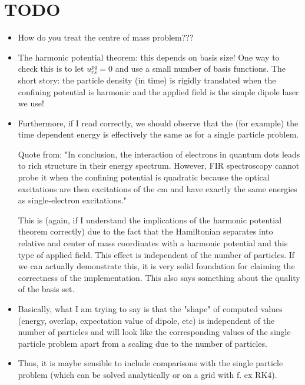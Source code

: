 \documentclass[aip,jcp,reprint,floatfix]{revtex4-1}
\begin{document}
\section{TODO}
\begin{itemize}
    \item How do you treat the centre of mass problem???
    \item The harmonic potential theorem\cite{HarmonicPotentialTheorem}: this depends on basis size! One way to check this is to let $u^{pq}_{rs} = 0$ and use a small number of basis functions. The short story: the particle density (in time) is rigidly translated when the confining potential is harmonic and the applied field is the simple dipole laser we use! 
    \item Furthermore, if I read correctly, we should observe that the (for example) the time dependent energy is effectively the same as for a single particle problem. 
    
    Quote from\cite{Chakraborty}: "In conclusion, the interaction of electrons in quantum
dots leads to rich structure in their energy spectrum.
However, FIR spectroscopy cannot probe it when the
confining potential is quadratic because the optical excitations are then excitations of the cm and have exactly
the same energies as single-electron excitations."
    
    This is (again, if I understand the implications of the harmonic potential theorem correctly) due to the fact that the Hamiltonian separates into relative and center of mass coordinates with a harmonic potential and this type of applied field. This effect is independent of the number of particles. If we can actually demonstrate this, it is very solid foundation for claiming the correctness of the implementation. This also says something about the quality of the basis set. 
    \item Basically, what I am trying to say is that the "shape" of computed values (energy, overlap, expectation value of dipole, etc) is independent of the number of particles and will look like the corresponding values of the single particle problem apart from a scaling due to the number of particles. 
    \item Thus, it is maybe sensible to include comparisons with the single particle problem (which can be solved analytically or on a grid with f. ex RK4).
\end{itemize}
\end{document}
